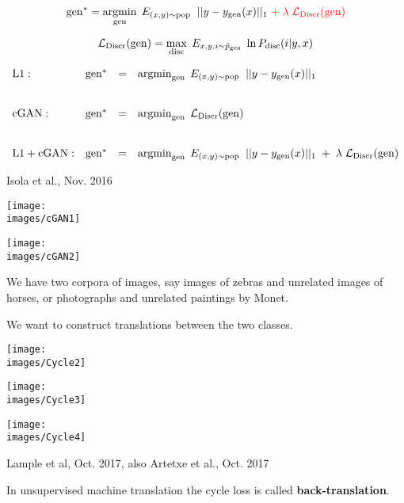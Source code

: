{$$\mathrm{gen}^* = \operatorname*{argmin}_{\mathrm{gen}}\;E_{(x,y) \sim \mathrm{pop}}\;\; ||y- y_{\mathrm{gen}}(x)||_1\; {\color{red} + \; \lambda\; {\cal L}_{\mathrm{Discr}}(\mathrm{gen})}$$

\vfill
$${\cal L}_\mathrm{Discr}(\mathrm{gen}) = \max_{\mathrm{disc}} \;E_{x,y,i \sim \tilde{p}_{\mathrm{gen}}}\; \ln P_{\mathrm{disc}}(i|y,x)$$


{\huge
$$\begin{array}{lrcl}
\mathrm{L1:} & \mathrm{gen}^* & = & \operatorname*{argmin}_{\mathrm{gen}}\;E_{(x,y) \sim \mathrm{pop}}\;\; ||y - y_{\mathrm{gen}}(x)||_1 \\
\\
\\
\mathrm{cGAN:} & \mathrm{gen}^* & = & \operatorname*{argmin}_{\mathrm{gen}}\;{\cal L}_{\mathrm{Discr}}(\mathrm{gen}) \\
\\
\\
\mathrm{L1 + cGAN:} & \mathrm{gen}^* & = & \operatorname*{argmin}_{\mathrm{gen}}\;E_{(x,y) \sim \mathrm{pop}}\;\; ||y - y_{\mathrm{gen}}(x)||_1\; +\; \lambda\; {\cal L}_\mathrm{Discr}(\mathrm{gen})
\end{array}$$
}


{Isola et al., Nov. 2016}

\centerline{\texttt{[image: \\images/cGAN1]}}


\centerline{\texttt{[image: \\images/cGAN2]}}


We have two corpora of images, say images of zebras and unrelated images of horses, or photographs and unrelated paintings by Monet.

\vfill
We want to construct translations between the two classes.

\centerline{\texttt{[image: \\images/Cycle2]}}


\centerline{\texttt{[image: \\images/Cycle3]}}


\centerline{\texttt{[image: \\images/Cycle4]}}

         {Lample et al, Oct. 2017, also Artetxe et al., Oct. 2017}


In unsupervised machine translation the cycle loss is called {\bf back-translation}.

}
